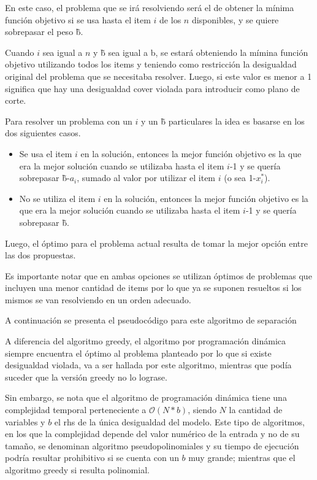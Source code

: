 En este caso, el problema que se ir\'a resolviendo ser\'a el de obtener la m\'inima funci\'on objetivo si se usa hasta el item $i$ de los $n$ disponibles, y se quiere sobrepasar el peso \~b.

Cuando $i$ sea igual a $n$ y \~b sea igual a b, se estar\'a obteniendo la m\'imina funci\'on objetivo utilizando todos los items y teniendo como restricci\'on la desigualdad original del problema que se necesitaba resolver. Luego, si este valor es menor a 1 significa que hay una desigualdad cover violada para introducir como plano de corte.



Para resolver un problema con un $i$ y un \~b particulares la idea es basarse en los dos siguientes casos.

\begin{itemize}
\item Se usa el item $i$ en la soluci\'on, entonces la mejor funci\'on objetivo es la que era la mejor soluci\'on cuando se utilizaba hasta el item $i$-1 y se quer\'ia sobrepasar \~b-$a_{i}$, sumado al valor por utilizar el item $i$ (o sea 1-$x_i^*$).
\item No se utiliza el item $i$ en la soluci\'on, entonces la mejor funci\'on objetivo es la que era la mejor soluci\'on cuando se utilizaba hasta el item $i$-1 y se quer\'ia sobrepasar \~b.
\end{itemize}

Luego, el \'optimo para el problema actual resulta de tomar la mejor opci\'on entre las dos propuestas.

Es importante notar que en ambas opciones se utilizan \'optimos de problemas que incluyen una menor cantidad de items por lo que ya se suponen resueltos si los mismos se van resolviendo en un orden adecuado.


A continuaci\'on se presenta el pseudoc\'odigo para este algoritmo de separaci\'on


\bigskip
\begin{algorithmic}
\EndFunction
\end{algorithmic}
\bigskip

A diferencia del algoritmo greedy, el algoritmo por programaci\'on din\'amica siempre encuentra el \'optimo al problema planteado por lo que si existe desigualdad violada, va a ser hallada por este algoritmo, mientras que pod\'ia suceder que la versi\'on greedy no lo lograse. 

Sin embargo, se nota que el algoritmo de programaci\'on din\'amica tiene una complejidad temporal perteneciente a $\mathcal{O}(N*b)$, siendo $N$ la cantidad de variables y $b$ el rhs de la \'unica desigualdad del modelo. Este tipo de algoritmos, en los que la complejidad depende del valor num\'erico de la entrada y no de su tama\~no, se denominan algoritmo pseudopolinomiales y su tiempo de ejecuci\'on podr\'ia resultar prohibitivo si se cuenta con un $b$ muy grande; mientras que el algoritmo greedy si resulta polinomial.


